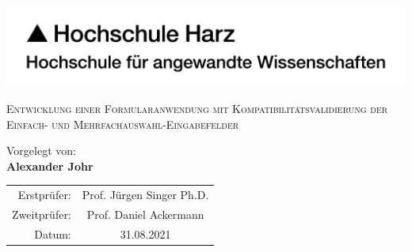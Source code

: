 \begin{titlepage}

    \includegraphics[width=0.5\paperwidth]{Sonstiges/Deckblatt/HSH-Logo-RGB-dt.pdf}

    \begin{center}



        \vfill


        \LARGE{\textsc{Entwicklung einer Formularanwendung mit Kompatibilitätsvalidierung der Einfach- und Mehrfachauswahl-Eingabefelder}}

        \vfill
        \vfill
        \vfill
        \vfill



        \normalsize
        Vorgelegt von:\\
       \textbf{Alexander Johr} 

        \vspace{21mm}

        \begin{tabular}{r c}
            Erstprüfer:  & Prof. Jürgen Singer Ph.D. \\
            Zweitprüfer: & Prof. Daniel Ackermann    \\
            Datum:       & 31.08.2021                \\
        \end{tabular}
 
        \vspace{5mm}

    \end{center}

\end{titlepage}